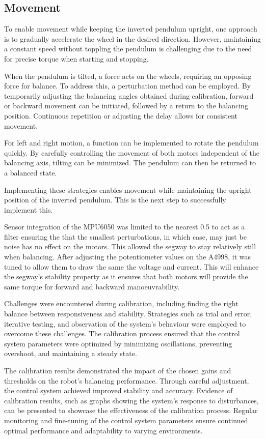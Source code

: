 \subsection{Movement}

To enable movement while keeping the inverted pendulum upright, one approach is to gradually accelerate the wheel in the desired direction. However, maintaining a constant speed without toppling the pendulum is challenging due to the need for precise torque when starting and stopping. 

When the pendulum is tilted, a force acts on the wheels, requiring an opposing force for balance. To address this, a perturbation method can be employed. By temporarily adjusting the balancing angles obtained during calibration, forward or backward movement can be initiated, followed by a return to the balancing position. Continuous repetition or adjusting the delay allows for consistent movement.

For left and right motion, a function can be implemented to rotate the pendulum quickly. By carefully controlling the movement of both motors independent of the balancing axis, tilting can be minimized. The pendulum can then be returned to a balanced state.

Implementing these strategies enables movement while maintaining the upright position of the inverted pendulum. This is the next step to successfully implement this. 

Sensor integration of the MPU6050 was limited to the nearest 0.5 to act as a filter ensuring the that the smallest perturbations, in which case, may just be noise has no effect on the motors. This allowed the segway to stay relatively still when balancing. After adjusting the potentiometer values on the A4998, it was tuned to allow them to draw the same the voltage and current. This will enhance the segway’s stability property as it ensures that both motors will provide the same torque for forward and backward manoeuvrability. 

Challenges were encountered during calibration, including finding the right balance between responsiveness and stability. Strategies such as trial and error, iterative testing, and observation of the system's behaviour were employed to overcome these challenges. The calibration process ensured that the control system parameters were optimized by minimizing oscillations, preventing overshoot, and maintaining a steady state.

The calibration results demonstrated the impact of the chosen gains and thresholds on the robot's balancing performance. Through careful adjustment, the control system achieved improved stability and accuracy. Evidence of calibration results, such as graphs showing the system's response to disturbances, can be presented to showcase the effectiveness of the calibration process. Regular monitoring and fine-tuning of the control system parameters ensure continued optimal performance and adaptability to varying environments.

